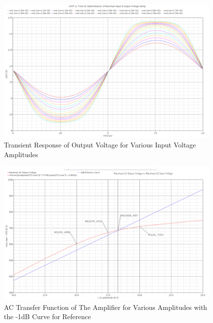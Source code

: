 \documentclass{article}
\begin{document}
\begin{figure}[H]
\centering
\includegraphics[width=6in]{2_cs_transient.png}
\caption{Transient Response of Output Voltage for Various Input Voltage Amplitudes}
\label{cs_tran}
\end{figure}

\begin{figure}[H]
\centering
\includegraphics[width=6in]{2_cs_linearity.png}
\caption{AC Transfer Function of The Amplifier for Various Amplitudes with the -1dB Curve for Reference}
\label{cs_lin}
\end{figure}
\newpage
\end{document}
